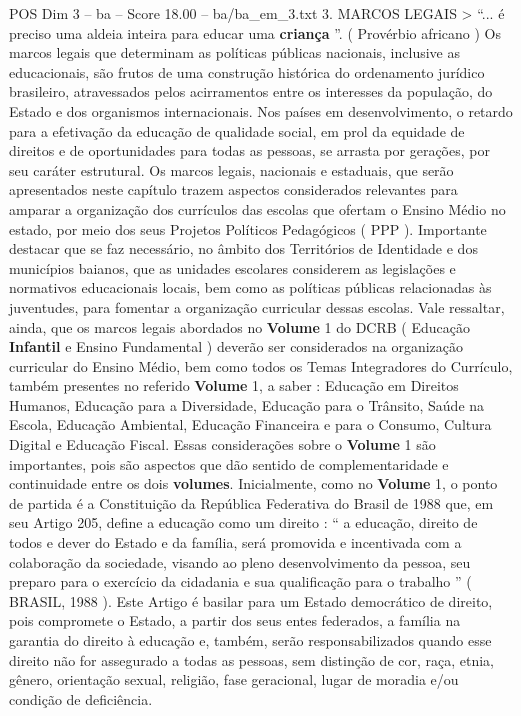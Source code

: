 \begin{textsample}{POS Dim 3 – ba – Score 18.00 – ba/ba\_em\_3.txt}  \label{ex:f3_pos_174}
3.
MARCOS LEGAIS > “... é preciso uma aldeia inteira para educar uma \textbf{criança} ”. ( Provérbio africano ) Os marcos legais que determinam as políticas públicas nacionais, inclusive as educacionais, são frutos de uma construção histórica do ordenamento jurídico brasileiro, atravessados pelos acirramentos entre os interesses da população, do Estado e dos organismos internacionais.
Nos países em desenvolvimento, o retardo para a efetivação da educação de qualidade social, em prol da equidade de direitos e de oportunidades para todas as pessoas, se arrasta por gerações, por seu caráter estrutural.
Os marcos legais, nacionais e estaduais, que serão apresentados neste capítulo trazem aspectos considerados relevantes para amparar a organização dos currículos das escolas que ofertam o Ensino Médio no estado, por meio dos seus Projetos Políticos Pedagógicos ( PPP ).
Importante destacar que se faz necessário, no âmbito dos Territórios de Identidade e dos municípios baianos, que as unidades escolares considerem as legislações e normativos educacionais locais, bem como as políticas públicas relacionadas às juventudes, para fomentar a organização curricular dessas escolas.
Vale ressaltar, ainda, que os marcos legais abordados no \textbf{Volume} 1 do DCRB ( Educação \textbf{Infantil} e Ensino Fundamental ) deverão ser considerados na organização curricular do Ensino Médio, bem como todos os Temas Integradores do Currículo, também presentes no referido \textbf{Volume} 1, a saber : Educação em Direitos Humanos, Educação para a Diversidade, Educação para o Trânsito, Saúde na Escola, Educação Ambiental, Educação Financeira e para o Consumo, Cultura Digital e Educação Fiscal.
Essas considerações sobre o \textbf{Volume} 1 são importantes, pois são aspectos que dão sentido de complementaridade e continuidade entre os dois \textbf{volumes}.
Inicialmente, como no \textbf{Volume} 1, o ponto de partida é a Constituição da República Federativa do Brasil de 1988 que, em seu Artigo 205, define a educação como um direito : “ a educação, direito de todos e dever do Estado e da família, será promovida e incentivada com a colaboração da sociedade, visando ao pleno desenvolvimento da pessoa, seu preparo para o exercício da cidadania e sua qualificação para o trabalho ” ( BRASIL, 1988 ).
Este Artigo é basilar para um Estado democrático de direito, pois compromete o Estado, a partir dos seus entes federados, a família na garantia do direito à educação e, também, serão responsabilizados quando esse direito não for assegurado a todas as pessoas, sem distinção de cor, raça, etnia, gênero, orientação sexual, religião, fase geracional, lugar de moradia e/ou condição de deficiência.

\end{textsample}
